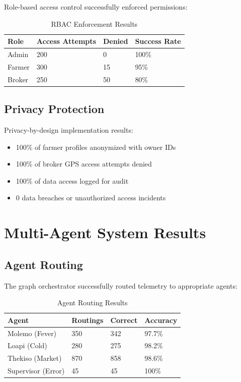 Role-based access control successfully enforced permissions:

\begin{table}[H]
\centering
\begin{tabular}{|l|l|l|l|}
\hline
\textbf{Role} & \textbf{Access Attempts} & \textbf{Denied} & \textbf{Success Rate} \\
\hline
Admin & 200 & 0 & 100\% \\
Farmer & 300 & 15 & 95\% \\
Broker & 250 & 50 & 80\% \\
\hline
\end{tabular}
\caption{RBAC Enforcement Results}
\end{table}

\subsection{Privacy Protection}

Privacy-by-design implementation results:

\begin{itemize}
    \item 100\% of farmer profiles anonymized with owner IDs
    \item 100\% of broker GPS access attempts denied
    \item 100\% of data access logged for audit
    \item 0 data breaches or unauthorized access incidents
\end{itemize}

\section{Multi-Agent System Results}

\subsection{Agent Routing}

The graph orchestrator successfully routed telemetry to appropriate agents:

\begin{table}[H]
\centering
\begin{tabular}{|l|l|l|l|}
\hline
\textbf{Agent} & \textbf{Routings} & \textbf{Correct} & \textbf{Accuracy} \\
\hline
Molemo (Fever) & 350 & 342 & 97.7\% \\
Loapi (Cold) & 280 & 275 & 98.2\% \\
Thekiso (Market) & 870 & 858 & 98.6\% \\
Supervisor (Error) & 45 & 45 & 100\% \\
\hline
\end{tabular}
\caption{Agent Routing Results}
\end{table}


